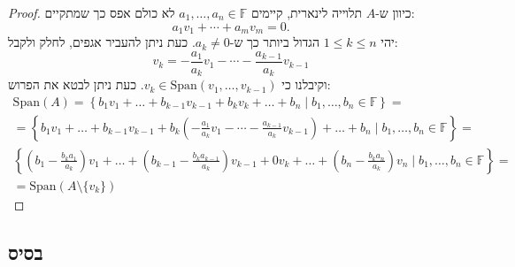 \documentclass{tstextbook}
\begin{document}
\begin{proof}
כיוון ש-\(A\) תלוייה לינארית, קיימים \(a_{1},\dots,a_{n}\in \mathbb{F}\) לא כולם אפס כך שמתקיים:
$$a_{1}v_{1}+\cdots+a_{m}v_{m}=0.$$
יהי \(1\leq k\leq n\) הגדול ביותר כך ש-\(a_{k}\neq 0\). כעת ניתן להעביר אגפים, לחלק ולקבל:
$$v_{k}=-{\frac{a_{1}}{a_{k}}}v_{1}-\cdots-{\frac{a_{k-1}}{a_{k}}}v_{k-1}$$
וקיבלנו כי \(v_{k}\in \mathrm{Span}\left( v_{1},\dots ,v_{k-1} \right)\). כעת ניתן לבטא את הפרוש:
$$\begin{gather}\mathrm{Span}(A)=\left\{  b_{1}v_{1}+\dots+b_{k-1}v_{k-1} +b_{k}v_{k}+\dots+b_{n}\mid b_{1},\dots,b_{n}\in \mathbb{F}   \right\} = \\=\left\{  b_{1}v_{1}+\dots+b_{k-1}v_{k-1} +b_{k}\left( -{\frac{a_{1}}{a_{k}}}v_{1}-\cdots-{\frac{a_{k-1}}{a_{k}}}v_{k-1} \right)+\dots+b_{n}\mid b_{1},\dots,b_{n}\in \mathbb{F}   \right\}= \\\left\{  \left( b_{1}-\frac{b_{k}a_{1}}{a_{k}} \right)v_{1}+\dots+\left( b_{k-1}-\frac{b_{k}a_{k-1}}{a_{k}} \right)v_{k-1}+0v_{k}+\dots+\left( b_{n}-\frac{b_{k}a_{n}}{a_{k}} \right)v_{n}\mid b_{1},\dots,b_{n}\in \mathbb{F}     \right\}= \\=\mathrm{Span}\left( A \setminus  \{ v_{k} \} \right)
\end{gather}$$

\end{proof}
\subsection{בסיס}
\end{document}
